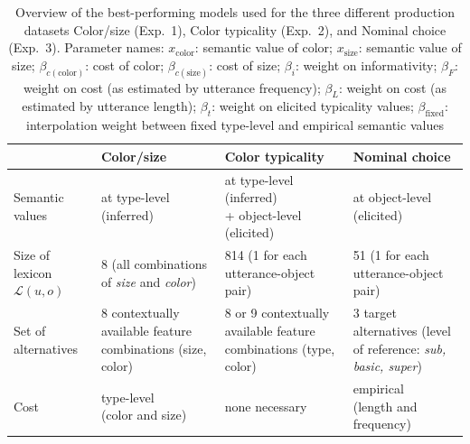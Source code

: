 \documentclass[11pt]{article}
\begin{document}
\begin{table}
\caption{Overview of the best-performing models used for the three different production datasets Color/size (Exp.~1), Color typicality (Exp.~2), and Nominal choice (Exp.~3). Parameter names:  $x_{\textrm{color}}$: semantic value of color; $x_{\textrm{size}}$: semantic value of size; $\beta_{c(\textrm{color})}$: cost of color;  $\beta_{c(\textrm{size})}$: cost of size; $\beta_i$: weight on informativity; $\beta_F$: weight on cost (as estimated by utterance frequency); $\beta_L$: weight on cost (as estimated by utterance length); $\beta_t$: weight on elicited typicality values; $\beta_{\textrm{fixed}}$: interpolation weight between fixed type-level and empirical semantic values} 
\begin{tabular}{p{2.5cm} p{4.2cm} p{4.2cm} p{4.2cm} }
\toprule
& Color/size & Color typicality & Nominal choice \\
\midrule
\makecell{Semantic \\ values} & at type-level (inferred) & \makecell{at type-level (inferred) \\ + object-level (elicited)} & at object-level (elicited) \\
\midrule
\makecell{Size of \\lexicon $\mathcal{L}(u,o)$}  & 8 (all combinations of \emph{size} and \emph{color}) & 814 (1 for each utterance-object pair) & 51 (1 for each utterance-object pair)\\
\midrule
\makecell{Set of \\alternatives} & 8 contextually available feature combinations (size, color) & 8 or 9 contextually available feature combinations (type, color) & 3 target alternatives (level of reference: \emph{sub, basic, super}) \\
\midrule
Cost & \makecell{type-level \\ (color and size)}& none necessary & \makecell{empirical \\ (length and frequency)} \\

\end{tabular}
\end{table}
\end{document}
